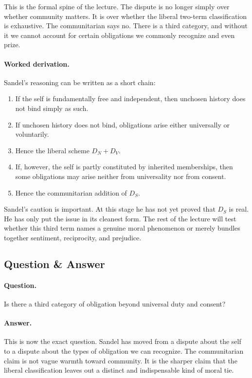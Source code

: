 This is the formal spine of the lecture. The dispute is no longer simply over whether community matters. It is over whether the liberal two-term classification is exhaustive. The communitarian says no. There is a third category, and without it we cannot account for certain obligations we commonly recognize and even prize.

\paragraph{Worked derivation.} Sandel's reasoning can be written as a short chain:
\begin{enumerate}
\item If the self is fundamentally free and independent, then unchosen history does not bind simply as such.
\item If unchosen history does not bind, obligations arise either universally or voluntarily.
\item Hence the liberal scheme \(D_N + D_V\).
\item If, however, the self is partly constituted by inherited memberships, then some obligations may arise neither from universality nor from consent.
\item Hence the communitarian addition of \(D_S\).
\end{enumerate}

Sandel's caution is important. At this stage he has not yet proved that \(D_S\) is real. He has only put the issue in its cleanest form. The rest of the lecture will test whether this third term names a genuine moral phenomenon or merely bundles together sentiment, reciprocity, and prejudice.

\subsection{Question \& Answer}

\paragraph{Question.} Is there a third category of obligation beyond universal duty and consent?

\paragraph{Answer.} This is now the exact question. Sandel has moved from a dispute about the self to a dispute about the types of obligation we can recognize. The communitarian claim is not vague warmth toward community. It is the sharper claim that the liberal classification leaves out a distinct and indispensable kind of moral tie.

